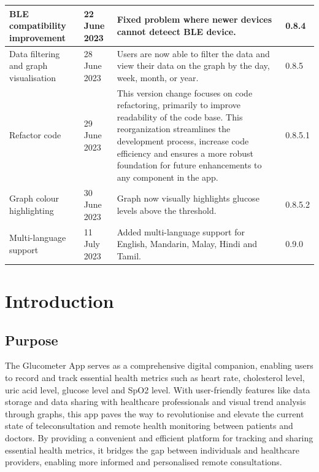\documentclass[a4paper]{scrreprt}
\begin{document}
\begin{center}
\begin{longtable}{|p{2.8cm}|l|p{7cm}|l|}
    \hline
    BLE compatibility improvement & 22 June 2023 & Fixed problem where newer devices cannot deteect BLE device. & 0.8.4\\
    \hline  
    Data filtering and graph visualisation & 28 June 2023 & Users are now able to filter the data and view their data on the graph by the day, week, month, or year. & 0.8.5\\
    \hline
    Refactor code & 29 June 2023 & This version change focuses on code refactoring, primarily to improve readability of the code base. This reorganization streamlines the development process, increase code efficiency and ensures a more robust foundation for future enhancements to any component in the app. & 0.8.5.1\\
    \hline
    Graph colour highlighting & 30 June 2023 & Graph now visually highlights glucose levels above the threshold. & 0.8.5.2\\
    \hline
    Multi-language support & 11 July 2023 & Added multi-language support for English, Mandarin, Malay, Hindi and Tamil. & 0.9.0\\
    \hline
\end{longtable}
\end{center}


\tableofcontents


\chapter{Introduction}

\section{Purpose}
The Glucometer App serves as a comprehensive digital companion, enabling users to record and track essential health metrics such as heart rate, cholesterol level, uric acid level, glucose level and SpO2 level.
\newline
With user-friendly features like data storage and data sharing with healthcare professionals and visual trend analysis through graphs, this app paves the way to revolutionise and elevate the current state of teleconsultation and remote health monitoring between patients and doctors.
\newline
By providing a convenient and efficient platform for tracking and sharing essential health metrics, it bridges the gap between individuals and healthcare providers, enabling more informed and personalised remote consultations.
\end{document}
